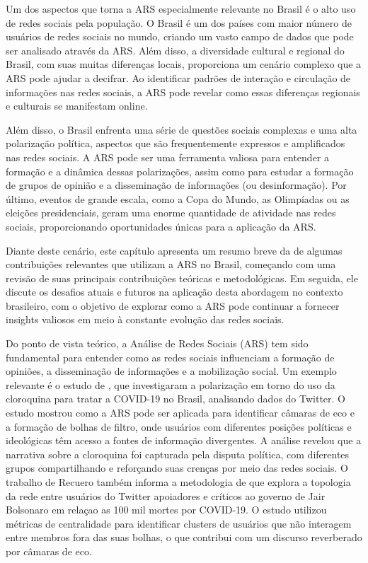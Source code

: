 Um dos aspectos que torna a ARS especialmente relevante no Brasil é o alto uso de redes sociais pela população. O Brasil é um dos países com maior número de usuários de redes sociais no mundo, criando um vasto campo de dados que pode ser analisado através da ARS. Além disso, a diversidade cultural e regional do Brasil, com suas muitas diferenças locais, proporciona um cenário complexo que a ARS pode ajudar a decifrar. Ao identificar padrões de interação e circulação de informações nas redes sociais, a ARS pode revelar como essas diferenças regionais e culturais se manifestam online.

Além disso, o Brasil enfrenta uma série de questões sociais complexas e uma alta polarização política, aspectos que são frequentemente expressos e amplificados nas redes sociais. A ARS pode ser uma ferramenta valiosa para entender a formação e a dinâmica dessas polarizações, assim como para estudar a formação de grupos de opinião e a disseminação de informações (ou desinformação). Por último, eventos de grande escala, como a Copa do Mundo, as Olimpíadas ou as eleições presidenciais, geram uma enorme quantidade de atividade nas redes sociais, proporcionando oportunidades únicas para a aplicação da ARS.

Diante deste cenário, este capítulo apresenta um resumo breve da de algumas contribuições relevantes que utilizam a ARS no Brasil, começando com uma revisão de suas principais contribuições teóricas e metodológicas. Em seguida, ele discute os desafios atuais e futuros na aplicação desta abordagem no contexto brasileiro, com o objetivo de explorar como a ARS pode continuar a fornecer insights valiosos em meio à constante evolução das redes sociais.

Do ponto de vista teórico, a Análise de Redes Sociais (ARS) tem sido fundamental para entender como as redes sociais influenciam a formação de opiniões, a disseminação de informações e a mobilização social. Um exemplo relevante é o estudo de , que investigaram a polarização em torno do uso da cloroquina para tratar a COVID-19 no Brasil, analisando dados do Twitter. O estudo mostrou como a ARS pode ser aplicada para identificar câmaras de eco e a formação de bolhas de filtro, onde usuários com diferentes posições políticas e ideológicas têm acesso a fontes de informação divergentes. A análise revelou que a narrativa sobre a cloroquina foi capturada pela disputa política, com diferentes grupos compartilhando e reforçando suas crenças por meio das redes sociais. O trabalho de Recuero também informa a metodologia de  que explora a topologia da rede entre usuários do Twitter apoiadores e críticos ao governo de Jair Bolsonaro em relaçao as 100 mil mortes por COVID-19. O estudo utilizou métricas de centralidade para identificar clusters de usuários que não interagem entre membros fora das suas bolhas, o que contribui com um discurso reverberado por câmaras de eco.

